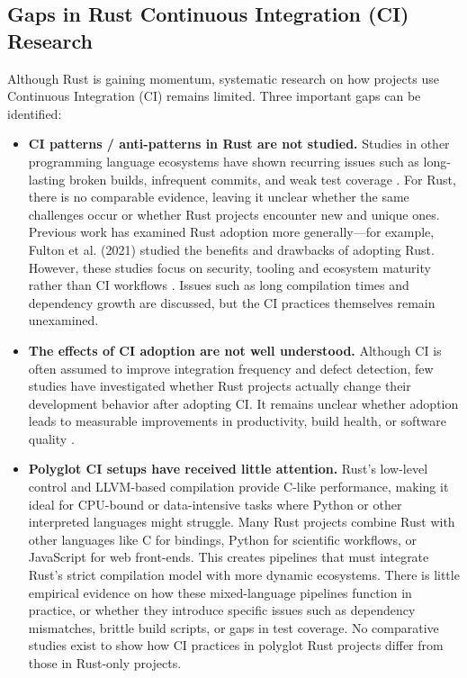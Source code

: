 \documentclass[11pt]{article}
\begin{document}
\subsection{Gaps in Rust Continuous Integration (CI) Research}
Although Rust is gaining momentum, systematic research on how projects use Continuous Integration (CI) remains limited. Three important gaps can be identified:
\begin{itemize}
\item \textbf{CI patterns / anti-patterns in Rust are not studied.}
Studies in other programming language ecosystems have shown recurring issues such as long-lasting broken builds, infrequent commits, and weak test coverage \autocite{felidre2019ci_theater}. For Rust, there is no comparable evidence, leaving it unclear whether the same challenges occur or whether Rust projects encounter new and unique ones. Previous work has examined Rust adoption more generally—for example, Fulton et al. (2021) studied the benefits and drawbacks of adopting Rust. However, these studies focus on security, tooling and ecosystem maturity rather than CI workflows \autocite{fulton2021}. Issues such as long compilation times and dependency growth are discussed, but the CI practices themselves remain unexamined.

\item \textbf{The effects of CI adoption are not well understood.}
Although CI is often assumed to improve integration frequency and defect detection, few studies have investigated whether Rust projects actually change their development behavior after adopting CI. It remains unclear whether adoption leads to measurable improvements in productivity, build health, or software quality \autocite{felidre2019ci_theater}.

\item \textbf{Polyglot CI setups have received little attention.}
Rust's low-level control and LLVM-based compilation provide C-like performance, making it ideal for CPU-bound or data-intensive tasks where Python or other interpreted languages might struggle. Many Rust projects combine Rust with other languages like C for bindings, Python for scientific workflows, or JavaScript for web front-ends. This creates pipelines that must integrate Rust’s strict compilation model with more dynamic ecosystems. There is little empirical evidence on how these mixed-language pipelines function in practice, or whether they introduce specific issues such as dependency mismatches, brittle build scripts, or gaps in test coverage. No comparative studies exist to show how CI practices in polyglot Rust projects differ from those in Rust-only projects.
\end{itemize}
\end{document}
